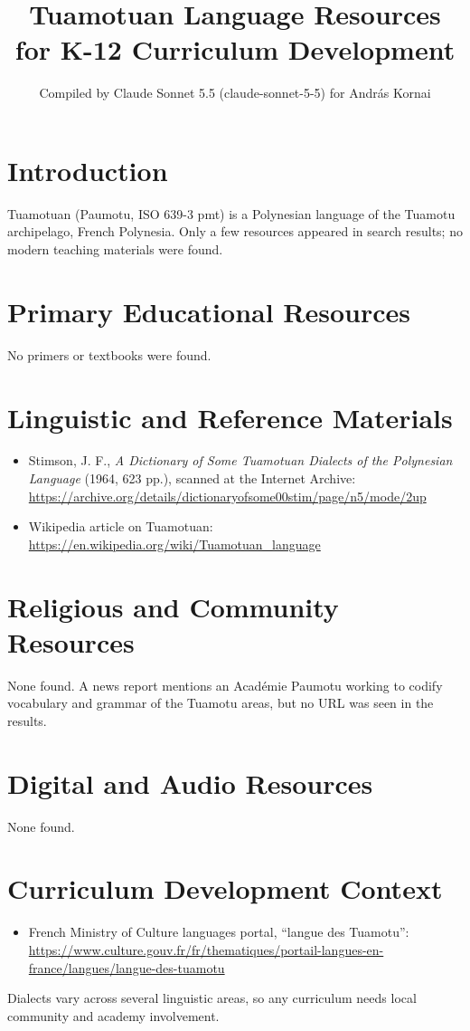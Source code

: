 \documentclass[12pt]{article}
\title{Tuamotuan Language Resources for K-12 Curriculum Development}
\author{Compiled by Claude Sonnet 5.5 (claude-sonnet-5-5) for Andr\'as Kornai}
\date{}
\begin{document}
\maketitle
\section{Introduction}
Tuamotuan (Pa\okina umotu, ISO 639-3 pmt) is a Polynesian language of the Tuamotu archipelago, French Polynesia. Only a few resources appeared in search results; no modern teaching materials were found.
\section{Primary Educational Resources}
No primers or textbooks were found.
\section{Linguistic and Reference Materials}
\begin{itemize}
\item Stimson, J. F., \emph{A Dictionary of Some Tuamotuan Dialects of the Polynesian Language} (1964, 623 pp.), scanned at the Internet Archive: \url{https://archive.org/details/dictionaryofsome00stim/page/n5/mode/2up}
\item Wikipedia article on Tuamotuan: \url{https://en.wikipedia.org/wiki/Tuamotuan_language}
\end{itemize}
\section{Religious and Community Resources}
None found. A news report mentions an Acad\'emie Paumotu working to codify vocabulary and grammar of the Tuamotu areas, but no URL was seen in the results.
\section{Digital and Audio Resources}
None found.
\section{Curriculum Development Context}
\begin{itemize}
\item French Ministry of Culture languages portal, ``langue des Tuamotu'': \url{https://www.culture.gouv.fr/fr/thematiques/portail-langues-en-france/langues/langue-des-tuamotu}
\end{itemize}
Dialects vary across several linguistic areas, so any curriculum needs local community and academy involvement.
\end{document}
